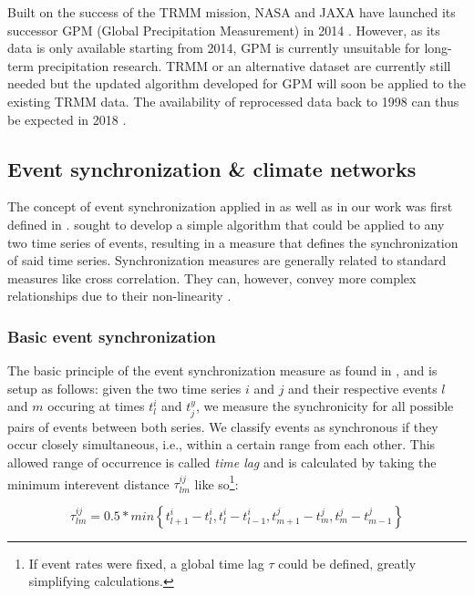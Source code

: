 Built on the success of the TRMM mission, NASA and JAXA have launched its successor GPM (Global Precipitation Measurement) in 2014 \citep{GoddardEarthScienceDataInformationandServicesCenter.2011}. However, as its data is only available starting from 2014, GPM is currently unsuitable for long-term precipitation research. TRMM or an alternative dataset are currently still needed but the updated algorithm developed for GPM will soon be applied to the existing TRMM data. The availability of reprocessed data back to 1998 can thus be expected in 2018 \citep{Huffman.2016}.


\subsection{Event synchronization \& climate networks}
\label{sst:event_sync}
The concept of event synchronization applied in \citet{Stolbova.2015} as well as in our work was first defined in \citet{QuianQuiroga.2002}. \citet{QuianQuiroga.2002} sought to develop a simple algorithm that could be applied to any two time series of events, resulting in a measure that defines the synchronization of said time series. Synchronization measures are generally related to standard measures like cross correlation. They can, however, convey more complex relationships due to their non-linearity \citep{QuianQuiroga.2002}.

\subsubsection{Basic event synchronization}
The basic principle of the event synchronization measure as found in \citet{QuianQuiroga.2002}, \citet{Malik.2010} and \citet{Stolbova.2015} is setup as follows: given the two time series $i$ and $j$ and their respective events $l$ and $m$ occuring at times $t^i_l$ and $t_j^y$, we measure the synchronicity for all possible pairs of events between both series. We classify events as synchronous if they occur closely simultaneous, i.e., within a certain range from each other. This allowed range of occurrence is called \textit{time lag} and is calculated by taking the minimum interevent distance $\tau^{ij}_{lm}$ like so\footnote{If event rates were fixed, a global time lag $\tau$ could be defined, greatly simplifying calculations.}:

\begin{equation}
\tau^{ij}_{lm} = 0.5 * min\left\{t^i_{l+1} - t^i_l, t^i_l - t^i_{l-1}, t^j_{m+1} - t^j_{m}, t^j_{m} - t^j_{m-1}\right\}
\end{equation}


